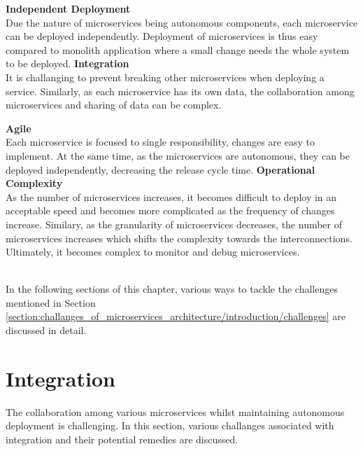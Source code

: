 \begin{multicols}{2}
  \textbf{Independent Deployment} \\Due the nature of microservices being autonomous components, each microservice can be deployed independently. Deployment of microservices is thus easy compared to monolith application where a small change needs the whole system to be deployed.\cite{Newman:2015aa}
  \vfill
  \columnbreak
  \textbf{Integration} \\It is challanging to prevent breaking other microservices when deploying a service. Similarly, as each microservice has its own data, the collaboration among microservices and sharing of data can be complex.
   \end{multicols}
   
  \begin{multicols}{2}
  \textbf{Agile}\\ Each microservice is focused to single responsibility, changes are easy to implement. At the same time, as the microservices are autonomous, they can be deployed independently, decreasing the release cycle time.
  \vfill
  \columnbreak
  \textbf{Operational Complexity} \\ As the number of microservices increases, it becomes difficult to deploy in an acceptable speed and becomes more complicated as the frequency of changes increase. Similary, as the granularity of microservices decreases, the number of microservices increases which shifts the complexity towards the interconnections. Ultimately, it becomes complex to monitor and debug microservices.
   \end{multicols}
\\
In the following sections of this chapter, various ways to tackle the challenges mentioned in Section \ref{section:challanges_of_microservices_architecture/introduction/challenges} are discussed in detail.

\section{Integration}\label{section:challanges_of_microservices_architecture/integration}
The collaboration among various microservices whilst maintaining autonomous deployment is challenging. In this section, various challanges associated with integration and their potential remedies are discussed.

